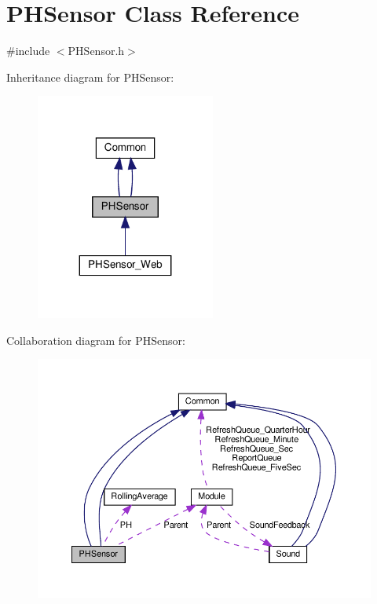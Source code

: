 \hypertarget{class_p_h_sensor}{}\section{P\+H\+Sensor Class Reference}
\label{class_p_h_sensor}


{\ttfamily \#include $<$P\+H\+Sensor.\+h$>$}



Inheritance diagram for P\+H\+Sensor\+:
\nopagebreak
\begin{figure}[H]
\begin{center}
\leavevmode
\includegraphics[width=167pt]{class_p_h_sensor__inherit__graph}
\end{center}
\end{figure}


Collaboration diagram for P\+H\+Sensor\+:
\nopagebreak
\begin{figure}[H]
\begin{center}
\leavevmode
\includegraphics[width=350pt]{class_p_h_sensor__coll__graph}
\end{center}
\end{figure}
